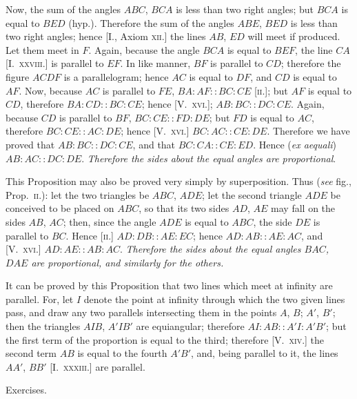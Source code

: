 \documentclass[oneside]{book}
\newcommand\exhead[1]{
\Needspace*{5\baselineskip}\begin{center}
\textsf{#1}
\end{center}
}
\begin{document}
Now, the sum of the angles
$ABC$, $BCA$ is less than two
right angles; but $BCA$ is equal
to $BED$ (hyp.). Therefore the sum of the angles $ABE$,
$BED$ is less than two right angles; hence [I., Axiom
\textsc{xii.}] the lines $AB$, $ED$ will meet if produced. Let them
meet in $F$. Again, because the angle $BCA$ is equal
to $BEF$, the line $CA$ [I.\ \textsc{xxviii.}] is parallel to $EF$. In
like manner, $BF$ is parallel to $CD$; therefore the figure
$ACDF$ is a parallelogram; hence $AC$ is equal to $DF$,
and $CD$ is equal to $AF$. Now, because $AC$ is parallel
to $FE$, $BA:AF :: BC:CE$ \textsc{[ii.]}; but $AF$ is equal to
$CD$, therefore $BA:CD :: BC:CE$; hence [V.~\textsc{xvi.}];
$AB:BC :: DC:CE$. Again, because $CD$ is parallel
to $BF$, $BC:CE :: FD:DE$; but $FD$ is equal to
$AC$, therefore $BC:CE :: AC:DE$; hence [V.~\textsc{xvi.}]
$BC:AC :: CE:DE$. Therefore we have proved that
$AB:BC :: DC:CE$, and that $BC:CA :: CE:ED$.
Hence (\emph{ex aequali}) $AB:AC :: DC:DE$. \emph{Therefore
the sides about the equal angles are proportional}.

\smallskip
\begin{footnotesize}
This Proposition may also be proved very simply by superposition.
Thus (\emph{see} fig., Prop.~\textsc{ii.}): let the two triangles be $ABC$,
$ADE$; let the second triangle $ADE$ be conceived to be placed on
$ABC$, so that its two sides $AD$, $AE$ may fall on the sides $AB$,
$AC$; then, since the angle $ADE$ is equal to $ABC$, the side $DE$
is parallel to $BC$. Hence \textsc{[ii.]} $AD:DB :: AE:EC$; hence
$AD:AB :: AE:AC$, and [V.~\textsc{xvi.}] $AD:AE :: AB:AC$.
\textit{Therefore the sides about the equal angles $BAC$, $DAE$ are
proportional, and similarly for the others.}

It can be proved by this Proposition that two lines which meet
at infinity are parallel. For, let $I$ denote the point at infinity
through which the two given lines pass, and draw any two parallels
intersecting them in the points $A$, $B$; $A'$, $B'$; then the
triangles $AIB$, $A'IB'$ are equiangular; therefore $AI:AB :: A'I:A'B'$;
but the first term of the proportion is equal to the third;
therefore [V.~\textsc{xiv.}] the second term $AB$ is equal to the fourth
$A'B'$, and, being parallel to it, the lines $AA'$, $BB'$ [I.~\textsc{xxxiii.}]
are parallel.
\par\end{footnotesize}

\exhead{Exercises.}
\end{document}
